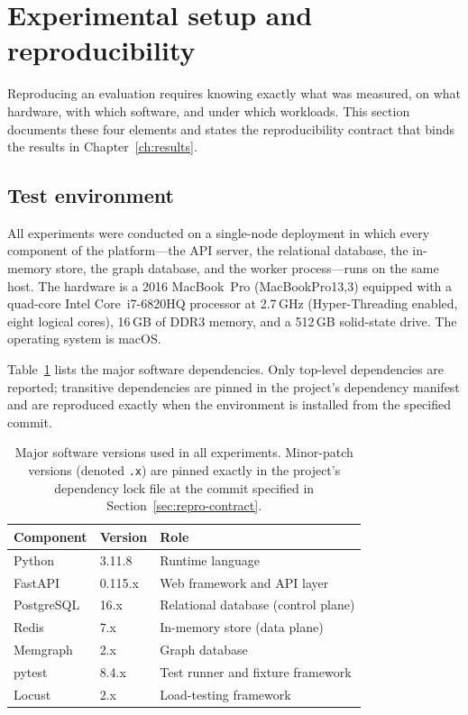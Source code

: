 \documentclass[a4paper,noexaminfo]{sapthesis}
\begin{document}
\section{Experimental setup and reproducibility}
\label{sec:experimental-setup}

Reproducing an evaluation requires knowing exactly what was measured, on
what hardware, with which software, and under which workloads.  This
section documents these four elements and states the reproducibility
contract that binds the results in Chapter~\ref{ch:results}.

\subsection{Test environment}

All experiments were conducted on a single-node deployment in which every
component of the platform---the API server, the relational database, the
in-memory store, the graph database, and the worker process---runs on the
same host.  The hardware is a 2016 MacBook~Pro (MacBookPro13,3) equipped
with a quad-core Intel Core~i7-6820HQ processor at 2.7\,GHz
(Hyper-Threading enabled, eight logical cores), 16\,GB of DDR3 memory,
and a 512\,GB solid-state drive.  The operating system is macOS.

Table~\ref{tab:software-versions} lists the major software dependencies.
Only top-level dependencies are reported; transitive dependencies are
pinned in the project's dependency manifest and are reproduced exactly
when the environment is installed from the specified commit.

\begin{table}[ht]
\centering
\caption{Major software versions used in all experiments.  Minor-patch
versions (denoted \texttt{.x}) are pinned exactly in the project's
dependency lock file at the commit specified in
Section~\ref{sec:repro-contract}.}
\label{tab:software-versions}
\small
\begin{tabularx}{\textwidth}{@{}l l X@{}}
    \hline
    \textbf{Component} & \textbf{Version} & \textbf{Role} \\
    \hline
    Python          & 3.11.8       & Runtime language \\
    FastAPI~\cite{fastapi2023} & 0.115.x & Web framework and API layer \\
    PostgreSQL      & 16.x         & Relational database (control plane) \\
    Redis           & 7.x          & In-memory store (data plane) \\
    Memgraph        & 2.x          & Graph database \\
    pytest          & 8.4.x        & Test runner and fixture framework \\
    Locust          & 2.x          & Load-testing framework \\
    \hline
\end{tabularx}
\end{table}
\end{document}
